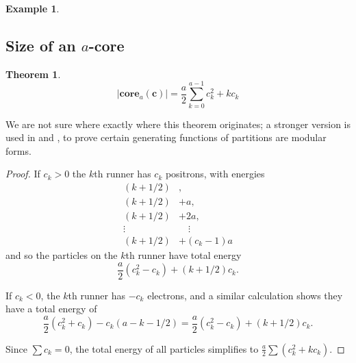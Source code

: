 \documentclass{amsart}[12pt]
\theoremstyle{definition}
\newtheorem{theorem}[dummy]{Theorem}
\newtheorem{example}[dummy]{Example}
\newcommand{\core}{\mathbf{core}}
\begin{document}
\begin{example}
\begin{center}
\end{center}
\end{example}




\subsection{Size of an \texorpdfstring{$a$}{a}-core}


\begin{theorem} \label{thm:quadratic}
$$|\core_a(\mathbf{c})|=\frac{a}{2}\sum_{k=0}^{a-1} c_k^2+ kc_k$$
\end{theorem}

We are not sure where exactly where this theorem originates; a stronger version is used in \cite{GKS} and \cite{DS}, to prove certain generating
functions of partitions are modular forms.

\begin{proof}
 If  $c_k>0$ the $k$th runner has $c_k$ positrons, with
 energies 
\begin{align*}
(k+1/2)&,\\
(k+1/2)&+a, \\
(k+1/2)&+2a,\\
\vdots\quad &\quad \vdots \\
 (k+1/2)&+(c_k-1)a
\end{align*}
 and so the
 particles on the $k$th runner have total energy
 $$\frac{a}{2}(c_k^2-c_k)+(k+1/2)c_k.$$

 If $c_k<0$, the $k$th runner has $-c_k$ electrons, and a similar calculation shows they have a total energy of $$\frac{a}{2}(c_k^2+c_k)-c_k(a-k-1/2)=\frac{a}{2}(c_k^2-c_k)+(k+1/2)c_k.$$

Since $\sum c_k=0$, the total energy of all particles simplifies to $\frac{a}{2}\sum (c_k^2+kc_k)$.
\end{proof}
\end{document}
